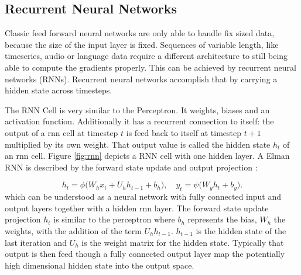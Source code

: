 \documentclass[twoside,a4paper,10pt,DIV=12,BCOR=12mm]{scrartcl}
\begin{document}
\subsection{Recurrent Neural Networks}

Classic feed forward neural networks are only able to handle fix sized data, because the size of the input layer
is fixed. Sequences of variable length, like timeseries, audio or language data require a different
architecture to still being able to compute the gradients properly. This can be achieved by recurrent
neural networks (RNNs). Recurrent neural networks accomplish that by carrying a hidden state across timesteps.

\begin{center}
  \label{fig:rnn}
\end{center}

The RNN Cell is very similar to the Perceptron. It weights, biases and an activation function. Additionally 
it has a recurrent connection to itself: the output of a rnn cell at timestep $t$ is feed back to itself at timestep
$t+1$ multiplied by its own weight. That output value is called the hidden state $h_t$ of an rnn cell.
Figure \ref{fig:rnn} depicts a RNN cell with one hidden layer.
A Elman RNN is described by the forward state update and output projection \cite{Elman90}:

$$
h_t = \phi\!\bigl(W_h x_t + U_h h_{t-1} + b_h\bigr), \quad
y_t = \psi\!\bigl(W_y h_t + b_y\bigr).
$$
which can be understood as a neural network with fully connected input and output layers together with a hidden rnn layer.
The forward state update projection $h_t$ is similar to the perceptron where $b_h$ represents the bias, $W_h$ the weights,
with the addition of the term $U_hh_{t-1}$. $h_{t-1}$ is the hidden state of the last iteration and $U_h$ is the weight
matrix for the hidden state. Typically that output is then feed though a fully connected output layer map the
potentially high dimensional hidden state into the output space.\\
\end{document}
